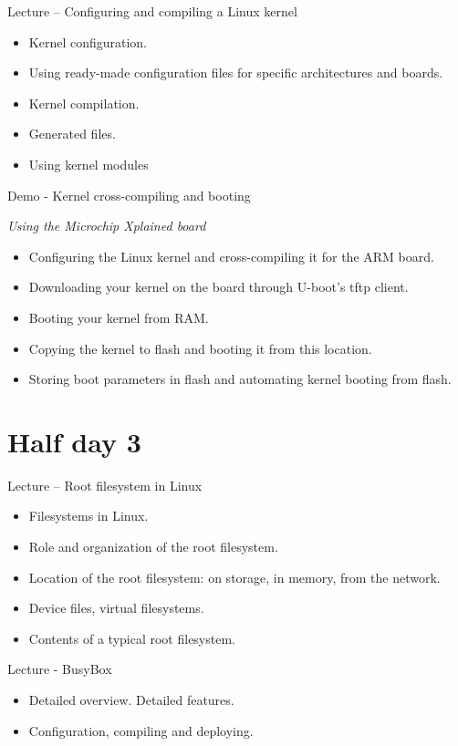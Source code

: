 \documentclass[a4paper,12pt,obeyspaces,spaces,hyphens]{article}
\begin{document}
\feagendatwocolumn
{Lecture – Configuring and compiling a Linux kernel}
{
  \begin{itemize}
  \item Kernel configuration.
  \item Using ready-made configuration files for specific
    architectures and boards.
  \item Kernel compilation.
  \item Generated files.
  \item Using kernel modules
  \end{itemize}
}
{Demo - Kernel cross-compiling and booting}
{
  {\em Using the Microchip Xplained board}
  \begin{itemize}
  \item Configuring the Linux kernel and cross-compiling it for the ARM board.
  \item Downloading your kernel on the board through U-boot's tftp client.
  \item Booting your kernel from RAM.
  \item Copying the kernel to flash and booting it from this location.
  \item Storing boot parameters in flash and automating kernel booting from flash.
  \end{itemize}
}

\section{Half day 3}

\feagendatwocolumn
{Lecture – Root filesystem in Linux}
{
  \begin{itemize}
  \item Filesystems in Linux.
  \item Role and organization of the root filesystem.
  \item Location of the root filesystem: on storage, in memory,
        from the network.
  \item Device files, virtual filesystems.
  \item Contents of a typical root filesystem.
  \end{itemize}
}
{Lecture - BusyBox}
{
  \begin{itemize}
  \item Detailed overview. Detailed features.
  \item Configuration, compiling and deploying.
  \end{itemize}
}
\end{document}
